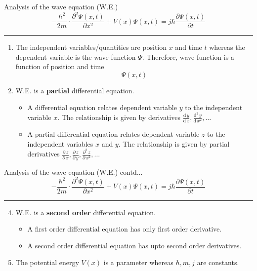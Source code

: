 \begin{frame}{Analysis of the wave equation (W.E.)}
	\[
	-\frac{\hbar^2}{2m} \cdot \frac{\partial^2 \Psi(x, t)}{\partial x^2} + V(x) \Psi(x, t)= j \hbar \frac{\partial \Psi(x, t)}{\partial t}
	\]
	\hrule
		\begin{enumerate}
		\item The independent variables/quantities are position \(x\) and time \(t\) whereas the dependent variable is the wave function \(\Psi\). Therefore, wave function is a function of position and time
		\[
		\Psi(x, t)
		\]
		\item W.E. is a \textbf{partial} differential equation.
		\begin{itemize}
				\item A differential equation relates dependent variable \(y\) to the independent variable \(x\). The relationship is given by derivatives \(\tfrac{\mathrm{d} \,y}{\mathrm{d} \, x},  \tfrac{\mathrm{d}^2 \, y}{\mathrm{d}\, x^2}, \ldots\)
			\item A partial differential equation relates dependent variable \(z\) to the independent variables \(x\) and \(y\). The relationship is given by partial derivatives \(\tfrac{\partial \,z}{\partial \, x}, \tfrac{\partial \,z}{\partial \, y},  \tfrac{\partial^2 \, z}{\partial\, x^2}, \ldots\)
		\end{itemize}
	\end{enumerate}
\end{frame}
%
%
\begin{frame}{Analysis of the wave equation (W.E.) contd...}
	\[
	-\frac{\hbar^2}{2m} \cdot \frac{\partial^2 \Psi(x, t)}{\partial x^2} + V(x) \Psi(x, t)= j \hbar \frac{\partial \Psi(x, t)}{\partial t}
	\]
	\hrule
		\begin{enumerate}
			\setcounter{enumi}{3}
			\item W.E. is a \textbf{second order} differential equation.
			\begin{itemize}
				\item A first order differential equation has only first order derivative.
				\item A second order differential equation has upto second order derivatives.
			\end{itemize}
			\item The potential energy \(V(x)\) is a parameter whereas \(\hbar, m, j\) are constants.
		\end{enumerate}
\end{frame}
%
